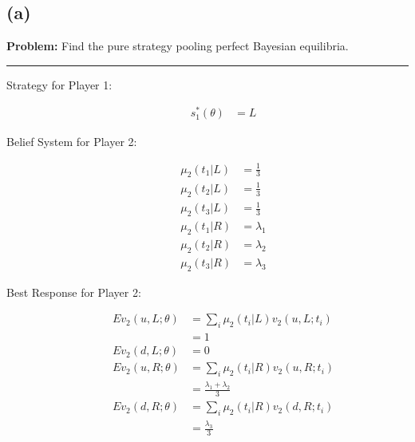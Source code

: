 \documentclass[10pt]{extarticle}
\begin{document}
    \subsection{(a)}%
    \textbf{Problem:} Find the pure strategy pooling perfect Bayesian equilibria.
    \begin{center}
    \rule{\textwidth}{0.4pt}
    \end{center}
    \begin{description}
      \item[Strategy for Player 1:]
        \begin{align*}
          s_1^{\ast}(\theta) &= L \tag*{$\forall \theta$}
        \end{align*}
      \item[Belief System for Player 2:]
        \begin{align*}
          \mu_2(t_1|L) &= \frac{1}{3}\\
          \mu_2(t_2|L) &= \frac{1}{3}\\
          \mu_2(t_3|L) &= \frac{1}{3}\\
          \mu_2(t_1|R) &= \lambda_1\\
          \mu_2(t_2|R) &= \lambda_2\\
          \mu_2(t_3|R) &= \lambda_3
        \end{align*}
      \item[Best Response for Player 2:]
        \begin{align*}
          Ev_2(u,L;\theta) &= \sum_{i} \mu_2(t_i|L)v_2(u,L;t_i)\\
                           &= 1\\
          Ev_2(d,L;\theta) &= 0\\
          Ev_2(u,R;\theta) &= \sum_{i}\mu_2(t_i|R)v_2(u,R;t_i)\\
                           &= \frac{\lambda_1 + \lambda_2}{3}\\
          Ev_2(d,R;\theta) &= \sum_{i}\mu_2(t_i|R)v_2(d,R;t_i)\\
                           &= \frac{\lambda_3}{3}
        \end{align*}
    \end{description}
\end{document}

